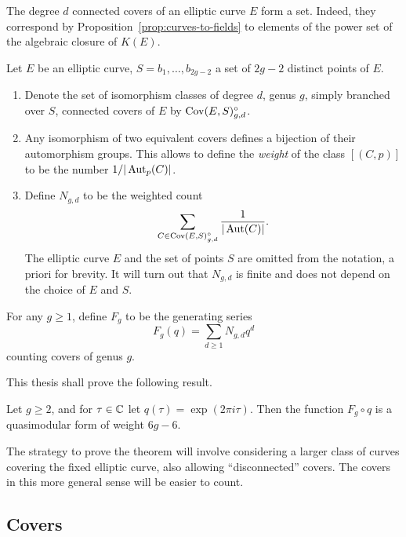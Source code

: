 \begin{rmk}
 The degree $d$ connected covers of an elliptic curve $E$ form a set. Indeed, they correspond by Proposition~\ref{prop:curves-to-fields} to elements of the power set of the algebraic closure of $K(E)$.
\end{rmk}

\begin{defi} Let $E$ be an elliptic curve, $S={b_1,\dotsc,b_{2g-2}}$ a set of $2g-2$ distinct points of $E$.
 \begin{enumerate}
  \item Denote the set of isomorphism classes of degree $d$, genus $g$, simply branched over $S$, connected covers of $E$ by $\operatorname{Cov}(E,S)^{\circ}_{g,d}$.
  
  \item Any isomorphism of two equivalent covers defines a bijection of their automorphism groups. This allows to define the \emph{weight} of the class $[(C,p)]$ to be the number $1/|\operatorname{Aut}_p(C)|$.
  
  \item Define $N_{g,d}$ to be the weighted count \[\sum_{C\in \operatorname{Cov}(E,S)^{\circ}_{g,d}} \frac{1}{|\operatorname{Aut}(C)|}.\] The elliptic curve $E$ and the set of points $S$ are omitted from the notation, a priori for brevity. It will turn out that $N_{g,d}$ is finite and does not depend on the choice of $E$ and $S$.
 \end{enumerate}
\end{defi}

\begin{defi}
 For any $g\geq 1$, define $F_g$ to be the generating series \[F_g(q)=\sum_{d\geq 1}N_{g,d}q^d\] counting covers of genus $g$.
\end{defi}

This thesis shall prove the following result.

\begin{thm}[Dijkgraaf]
 Let $g\geq 2$, and for $\tau\in\mathbb{C}$ let $q(\tau)=\exp(2\pi i\tau)$. Then the function $F_g\circ q$ is a quasimodular form of weight $6g-6$.
\end{thm}

The strategy to prove the theorem will involve considering a larger class of curves covering the fixed elliptic curve, also allowing ``disconnected'' covers. The covers in this more general sense will be easier to count.

\subsection{Covers}

